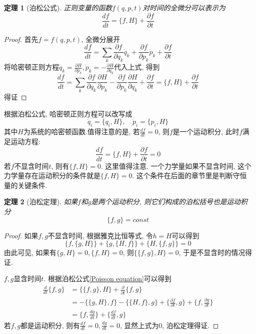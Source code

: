 \documentclass[a4paper,11pt]{book}
\newtheorem{theorem}{\hspace{2em}定理}[section]
\newtheorem{proof}{证明}[section]
\begin{document}
\begin{theorem}[泊松公式]
正则变量的函数$f(q,p,t)$对时间的全微分可以表示为
  \begin{equation}\label{Poisson equation}
  \frac{df}{dt}=\{f,H\}+\frac{\partial f}{\partial t}
  \end{equation}
\end{theorem}
\begin{proof}
  首先$f=f(q,p,t)$, 全微分展开
\begin{equation*}
  \frac{df}{dt}=\sum_{k}\frac{\partial f}{\partial{q_k}}\dot{q}_k+\frac{\partial f}{\partial{p_k}}\dot{p}_k+\frac{\partial f}{\partial t}
\end{equation*}
将哈密顿正则方程$\dot{q}_k=\frac{\partial H}{\partial{p_k}},\dot{p}_k=-\frac{\partial H}{\partial{q_k}}$代入上式, 得到
\begin{equation*}
  \frac{df}{dt}=\sum_{k}\frac{\partial f}{\partial{q_k}}\frac{\partial H}{\partial{p_k}}-\frac{\partial f}{\partial{p_k}}\frac{\partial H}{\partial{q_k}}+\frac{\partial f}{\partial t}=\{f,H\}+\frac{\partial f}{\partial t}
\end{equation*}
得证
\end{proof}
根据泊松公式, 哈密顿正则方程可以改写成
\begin{equation*}
  \dot{q}_i=\{q_i,H\},\quad \dot{p}_i=\{p_i,H\}
\end{equation*}
其中$H$为系统的哈密顿函数.值得注意的是, 若$\frac{df}{dt}=0$, 则$f$是一个运动积分, 此时$f$满足运动方程:
\begin{equation*}
  \frac{df}{dt}=\{f,H\}+\frac{\partial f}{\partial t}=0
\end{equation*}
若$f$不显含时间$t$, 则有$\{f,H\}=0$. 这里值得注意, 一个力学量如果不显含时间, 这个力学量存在运动积分的条件就是$\{f,H\}=0$. 这个条件在后面的章节里是判断守恒量的关键条件.
\begin{theorem}[泊松定理]
  如果$f$和$g$是两个运动积分, 则它们构成的泊松括号也是运动积分
  \begin{equation*}
    \{f,g\}=const
  \end{equation*}
\end{theorem}
\begin{proof}
  如果$f,g$不显含时间, 根据雅克比恒等式, 令$h=H$可以得到
\begin{equation*}
  \{f,\{g,H\}\}+\{g,\{H,f\}\}+\{H,\{f,g\}\}=0
\end{equation*}
由此可见, 如果有$\{g,H\}=0,\{f,H\}=0$, 则$\{\{f,g\},H\}=0$, 于是不显含时的情况得证.

$f,g$显含时间$t$. 根据泊松公式\eqref{Poisson equation}可以得到
\begin{equation*}
\begin{split}
   \frac{d}{dt}\{f,g\}&=\{\{f,g\},H\}+\frac{\partial}{\partial t}\{f,g\} \\
     &=-\{\{g,H\},f\}-\{\{H,f\},g\}+\{\frac{\partial f}{\partial t},g\}+\{f,\frac{\partial g}{\partial t}\} \\
     &=\{f,\frac{dg}{dt}\}+\{\frac{df}{dt},g\}
\end{split}
\end{equation*}
若$f,g$都是运动积分, 则有$\frac{df}{dt}=0,\frac{dg}{dt}=0$, 显然上式为0, 泊松定理得证.
\end{proof}
\end{document}
